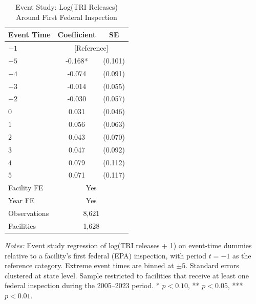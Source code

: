 \begin{table}[htbp]
\centering
\caption{Event Study: Log(TRI Releases) Around First Federal Inspection}
\label{tab:eventstudy}
\begin{threeparttable}
\begin{tabular}{lcc}
\toprule
Event Time & Coefficient & SE \\
\midrule
$-1$ & \multicolumn{2}{c}{[Reference]} \\
$-5$ & -0.168* & (0.101) \\
$-4$ & -0.074 & (0.091) \\
$-3$ & -0.014 & (0.055) \\
$-2$ & -0.030 & (0.057) \\
$0$ & 0.031 & (0.046) \\
$1$ & 0.056 & (0.063) \\
$2$ & 0.043 & (0.070) \\
$3$ & 0.047 & (0.092) \\
$4$ & 0.079 & (0.112) \\
$5$ & 0.071 & (0.117) \\
\midrule
Facility FE & \multicolumn{2}{c}{Yes} \\
Year FE & \multicolumn{2}{c}{Yes} \\
Observations & \multicolumn{2}{c}{8,621} \\
Facilities & \multicolumn{2}{c}{1,628} \\
\bottomrule
\end{tabular}
\begin{tablenotes}[flushleft]
\small
\item \textit{Notes:} Event study regression of log(TRI releases + 1) on event-time dummies relative to a facility's first federal (EPA) inspection, with period $t = -1$ as the reference category. Extreme event times are binned at $\pm 5$. Standard errors clustered at state level. Sample restricted to facilities that receive at least one federal inspection during the 2005--2023 period. * $p < 0.10$, ** $p < 0.05$, *** $p < 0.01$.
\end{tablenotes}
\end{threeparttable}
\end{table}

